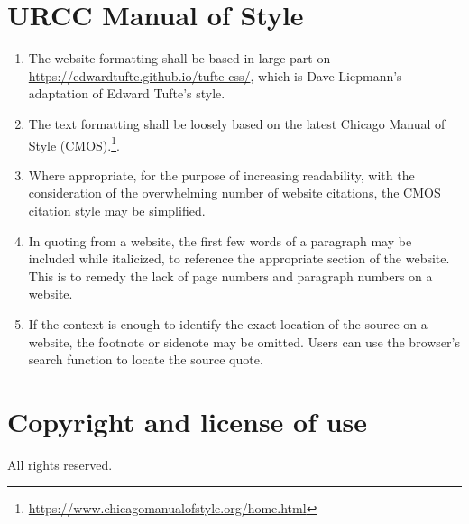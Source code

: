 \documentclass[12pt]{article}
\begin{document}


\section{URCC Manual of Style}

\begin{enumerate}
	\item The website formatting shall be based in large part on \href{https://edwardtufte.github.io/tufte-css/}{https://edwardtufte.github.io/tufte-css/}, which is Dave Liepmann's adaptation of Edward Tufte's style.
	\item The text formatting shall be loosely based on the latest Chicago Manual of Style (CMOS).\footnote{\href{https://www.chicagomanualofstyle.org/home.html}{https://www.chicagomanualofstyle.org/home.html}}.
	\item Where appropriate, for the purpose of increasing readability, with the consideration of the overwhelming number of website citations, the CMOS citation style may be simplified.
	\item In quoting from a website, the first few words of a paragraph may be included while italicized, to reference the appropriate section of the website. This is to remedy the lack of page numbers and paragraph numbers on a website.
	\item If the context is enough to identify the exact location of the source on a website, the footnote or sidenote may be omitted. Users can use the browser's search function to locate the source quote.
\end{enumerate}

\section{Copyright and license of use}

All rights reserved.

\end{document}
